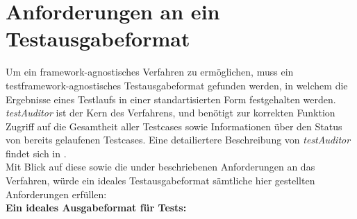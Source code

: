 \section{Anforderungen an ein Testausgabeformat}\label{Anforderungen Testausgabeformat}
Um ein framework-agnostisches Verfahren zu ermöglichen, muss ein testframework-agnostisches Testausgabeformat gefunden werden, in welchem die Ergebnisse eines Testlaufs in einer standartisierten Form festgehalten werden.\\
\textit{testAuditor} ist der Kern des Verfahrens, und benötigt zur korrekten Funktion Zugriff auf die Gesamtheit aller Testcases sowie Informationen über den Status von bereits gelaufenen Testcases. Eine detailiertere Beschreibung von \textit{testAuditor} findet sich in .\\
Mit Blick auf diese sowie die under  beschriebenen Anforderungen an das Verfahren, würde ein ideales Testausgabeformat sämtliche hier gestellten Anforderungen erfüllen:\\
\textbf{Ein ideales Ausgabeformat für Tests:}
